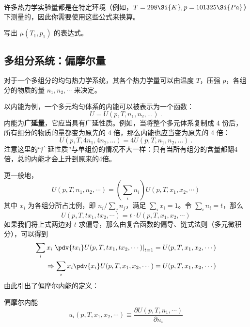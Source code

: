 许多热力学实验量都是在特定环境（例如，$T = 298 \Si{K}, p = 101325\Si{Pa}$）下测量的，因此你需要使用这些公式来换算。

\begin{exercise}{}
写出 $\mu(T_1,p_1)$ 的表达式。
\end{exercise}

\subsection{多组分系统：偏摩尔量}
对于一个多组分的均匀热力学系统，其各个热力学量可以由温度 $T$，压强 $p$，各组分的物质的量 $n_1,n_2,\cdots $ 来决定。

以内能为例，一个多元均匀体系的内能可以被表示为一个函数：
\begin{equation}
U = U (p, T, n_1, n_2, ...)~.
\end{equation}
内能为\textbf{广延量}，它应当具有广延性质。例如，当将整个多元体系复制成 4 份后，所有组分的物质的量都变为原先的 4 倍，那么内能也应当变为原先的 4 倍：
$$ U (p, T, 4n_1, 4n_2, ...) = 4U (p, T, n_1, n_2, ...)~.$$
注意这里的“广延性质”与单组份的情况不大一样：只有当所有组分的含量都翻4倍，总的内能才会上升到原来的4倍。

更一般地，
\begin{equation}
U(p,T,n_1,n_2,\cdots )=\left(\sum_i n_i\right) U(p,T,x_1,x_2,\cdots)
\end{equation}
其中 $x_i$ 为各组分所占比例，即 $n_i/\sum_j n_j$，满足 $\sum_i x_i=1$。令 $\sum_i n_i=t$，那么
\begin{equation}
U(p,T,tx_1,tx_2,\cdots)=t\cdot U(p,T,x_1,x_2,\cdots)
\end{equation}
如果我们将上式两边对 $t$ 求偏导，那么由复合函数的偏导、链式法则（多元微积分），可以得到
\begin{equation}
\begin{aligned}
\sum_i x_i \left.\pdv{tx_i} U(p,T,tx_1,tx_2,\cdots )\right|_{t=1}=U(p,T,x_1,x_2,\cdots)\\
\Rightarrow 
\sum_i x_i \pdv{x_i} U(p,T,x_1,x_2,\cdots )=U(p,T,x_1,x_2,\cdots)
\end{aligned}
\end{equation}
由此引出了偏摩尔内能的定义：
\begin{definition}{偏摩尔内能}
\begin{equation}
u_i(p,T,x_1,x_2,\cdots )\equiv \frac{\partial U(p,T,n_1,\cdots)}{\partial n_i}
\end{equation}
\end{definition}

